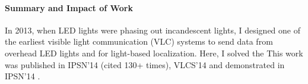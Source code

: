 \documentclass[10pt]{article}
\begin{document}

\paragraph{Summary and Impact of Work}
In 2013, when LED lights were phasing out
incandescent lights, I designed one of the earliest visible light
communication (VLC) systems to send data from overhead LED lights and
for light-based localization. Here, I solved the This work was published in IPSN'14\cite{rajagopal2014visual}
(cited 130+ times), VLCS'14 \cite{rajagopal2014hybrid} and demonstrated in IPSN'14 \cite{rajagopal2014demonstration}.  
\end{document}
